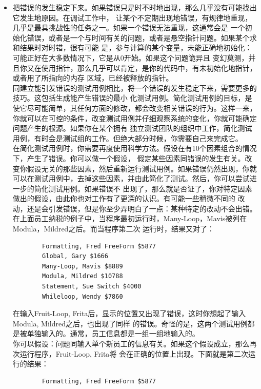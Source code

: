 \documentclass{article}
\begin{document}
\begin{itemize}
    \item 把错误的发生稳定下来。如果错误只是时不时地出现，那么几乎没有可能找出它发生地原因。在调试工作中，
    让某个不定期出现地错误，有规律地重现，几乎是最具挑战性的任务之一。如果一个错误无法重现，这通常会是
    一个初始化错误，或者是一个与时间有关的问题，或者是悬空指针问题。如果某个求和结果时对时错，很有可能
    是，参与计算的某个变量，未能正确地初始化：可能正好在大多数情况下，它是从0开始。如果这个问题诡异且
    变幻莫测，并且你又在使用指针，那么几乎可以肯定，是你的代码中，有未初始化地指针，或者用了所指向的内存
    区域，已经被释放的指针。\\
    同建立能引发错误的测试用例相比，将一个错误的发生稳定下来，需要更多的技巧。这包括生成能产生错误的最小
    化测试用例。简化测试用例的目标，是使它尽可能简单，其任何方面的修改，都会改变相关错误的行为。这样一来，
    你就可以在可控的条件，改变测试用例并仔细观察系统的变化，你就可能确定问题产生的根源。如果你在某个拥有
    独立测试团队的组织中工作，简化测试用例，有时会是测试组的工作。但绝大部分时候，你需要自己来完成它。\\
    在简化测试用例时，你需要再度使用科学方法。假设在有10个因素组合的情况下，产生了错误。你可以做一个假设，
    假定某些因素同错误的发生有关。改变你假设无关的那些因素，然后重新运行测试用例。如果错误仍然出现，你就
    可以在测试用例中，去掉这些因素，并由此简化了测试。然后，你可以尝试进一步的简化测试用例。如果错误不
    出现了，那么就是否证了，你对特定因素做出的假设，由此你也对工作有了更深的认识。有可能一些稍微不同的
    改动，还是会引发错误，但是你至少弄明白了一点：某种特定的改动不会出错。\\
    在上面员工纳税的例子中，当程序最初运行时，Many-Loop，Mavis被列在Modula，Mildred之后。而当程序第二次
    运行时，结果又对了：
    \begin{lstlisting}
        Formatting, Fred FreeForm $5877
        Global, Gary $1666
        Many-Loop, Mavis $8889
        Modula, Mildred $10788
        Statement, Sue Switch $4000
        Whileloop, Wendy $7860
    \end{lstlisting}
    在输入Fruit-Loop, Frita后，显示的位置又出现了错误，这时你想起了输入Modula, Mildred之后，也出现了同样
    的错误。奇怪的是，这两个测试用例都是被单独输入的。通常，员工信息都是一组一组地输入的。\\
    你可以假设：问题同输入单个新员工的信息有关。如果这个假设成立，那么再次运行程序，Fruit-Loop, Frita将
    会在正确的位置上出现。下面就是第二次运行的结果：
    \begin{lstlisting}
        Formatting, Fred FreeForm $5877

\end{lstlisting}
\end{itemize}
\end{document}
